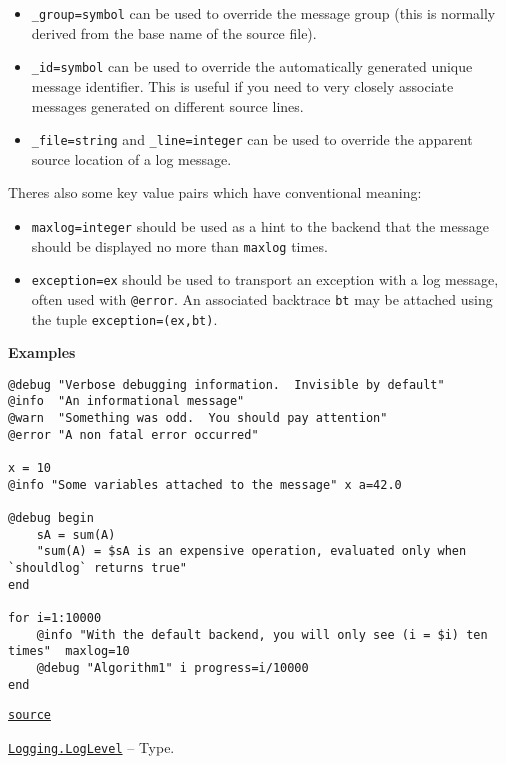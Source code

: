 \begin{adjustwidth}{2em}{0pt}
\begin{itemize}
\item \texttt{\_group=symbol} can be used to override the message group (this is normally derived from the base name of the source file).


\item \texttt{\_id=symbol} can be used to override the automatically generated unique message identifier.  This is useful if you need to very closely associate messages generated on different source lines.


\item \texttt{\_file=string} and \texttt{\_line=integer} can be used to override the apparent source location of a log message.

\end{itemize}
There{\textquotesingle}s also some key value pairs which have conventional meaning:

\begin{itemize}
\item \texttt{maxlog=integer} should be used as a hint to the backend that the message should be displayed no more than \texttt{maxlog} times.


\item \texttt{exception=ex} should be used to transport an exception with a log message, often used with \texttt{@error}. An associated backtrace \texttt{bt} may be attached using the tuple \texttt{exception=(ex,bt)}.

\end{itemize}
\textbf{Examples}


\begin{verbatim}
@debug "Verbose debugging information.  Invisible by default"
@info  "An informational message"
@warn  "Something was odd.  You should pay attention"
@error "A non fatal error occurred"

x = 10
@info "Some variables attached to the message" x a=42.0

@debug begin
    sA = sum(A)
    "sum(A) = $sA is an expensive operation, evaluated only when `shouldlog` returns true"
end

for i=1:10000
    @info "With the default backend, you will only see (i = $i) ten times"  maxlog=10
    @debug "Algorithm1" i progress=i/10000
end
\end{verbatim}



\href{https://github.com/JuliaLang/julia/blob/9058264a69f9efc1af805c4473c946f87859b731/base/logging.jl#L243-L310}{\texttt{source}}


\end{adjustwidth}
\hypertarget{10879938884267981707}{}
\hyperlink{10879938884267981707}{\texttt{Logging.LogLevel}}  -- {Type.}

